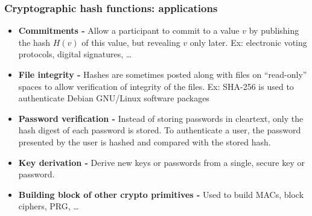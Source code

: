 \documentclass[aspectratio=169, lualatex, handout, 10pt,dvipsnames,svgnames]{beamer} %
\def\envert#1{\textcolor{vert}{#1}}
\begin{document}
\begin{frame}

  \frametitle{Cryptographic hash functions: applications}


  \begin{itemize}
  \item {\bf Commitments -} Allow a participant to commit to a value $v$ by publishing the hash $H(v)$ of this value, but revealing $v$ only later. \envert{Ex: electronic voting protocols, digital signatures, \dots}
    \medskip{}
    \pause

  \item {\bf File integrity -} Hashes are sometimes posted along with files on ``read-only'' spaces to allow verification of integrity of the files. \envert{Ex: SHA-256 is used to authenticate Debian GNU/Linux software packages}
    \medskip{}
    \pause

  \item {\bf Password verification -} Instead of storing passwords in cleartext, only the hash digest of each password is stored. To authenticate a user, the password presented by the user is hashed and compared with the stored hash.
    \medskip{}
    \pause

    
  \item {\bf Key derivation -} Derive new keys or passwords from a single, secure key or password.
    \medskip{}
    \pause

  \item {\bf Building block of other crypto primitives -} Used to build MACs, block ciphers, PRG, \dots
  \end{itemize}

\end{frame}
\end{document}
